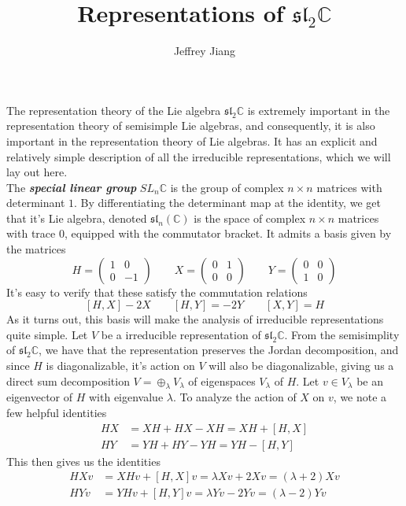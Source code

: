 \documentclass[psamsfonts]{amsart}
\theoremstyle{definition}
\theoremstyle{remark}
\renewcommand{\sl}{\mathfrak{sl}}
\newcommand{\ib}[1]{\textbf{\textit{#1}}}
\newcommand{\C}{\mathbb{C}}
\begin{document}
%
\author{Jeffrey Jiang}
%
\title{Representations of $\sl_2\C$}
%
\setcounter{section}{1}
%
\maketitle
%
The representation theory of the Lie algebra $\sl_2\C$ is extremely important
in the representation theory of semisimple Lie algebras, and consequently, it
is also important in the representation theory of Lie algebras. It has an explicit
and relatively simple description of all the irreducible representations, which
we will lay out here.\\

The \ib{special linear group} $SL_n\C$ is the group of complex $n \times n$
matrices with determinant $1$. By differentiating the determinant map at the
identity, we get that it's Lie algebra, denoted $\sl_n(\C)$ is the space
of complex $n \times n$ matrices with trace 0, equipped with the commutator
bracket. It admits a basis given by the matrices
\[
H = \begin{pmatrix}
1 & 0 \\
0 & -1
\end{pmatrix} \qquad X = \begin{pmatrix}
0 & 1 \\
0 & 0
\end{pmatrix} \qquad Y = \begin{pmatrix}
0 & 0 \\
1 & 0
\end{pmatrix}
\]
It's easy to verify that these satisfy the commutation relations
\[
[H,X] - 2X \qquad [H,Y] = -2Y \qquad [X,Y] = H
\]
As it turns out, this basis will make the analysis of irreducible representations
quite simple. Let $V$ be a irreducible representation of $\sl_2\C$. From the
semisimplity of $\sl_2\C$, we have that the representation preserves the Jordan
decomposition, and since $H$ is diagonalizable, it's action on $V$ will also be
diagonalizable, giving us a direct sum decomposition $V = \oplus_\lambda V_\lambda$
of eigenspaces $V_\lambda$ of $H$. Let $v \in V_\lambda$ be an eigenvector of $H$
with eigenvalue $\lambda$. To analyze the action of $X$ on $v$, we note a few
helpful identities
%
\begin{align*}
HX &= XH + HX - XH = XH + [H,X]\\
HY &= YH + HY - YH = YH - [H,Y]
\end{align*}
%
This then gives us the identities
%
\begin{align*}
HXv &= XHv + [H,X]v = \lambda Xv + 2Xv = (\lambda + 2)Xv \\
HYv &= YHv + [H,Y]v = \lambda Yv - 2Yv = (\lambda - 2)Yv
\end{align*}
\end{document}

